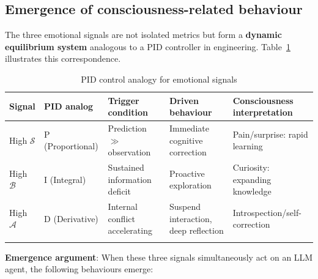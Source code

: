 \documentclass[pdflatex,sn-mathphys-num]{sn-jnl}
\newcommand{\surprise}{\mathcal{S}}
\newcommand{\boredom}{\mathcal{B}}
\newcommand{\anxiety}{\mathcal{A}}
\theoremstyle{thmstyleone}%
\theoremstyle{thmstyletwo}%
\theoremstyle{thmstylethree}%
\begin{document}
\subsection{Emergence of consciousness-related behaviour}\label{sec:emergence}

The three emotional signals are not isolated metrics but form a \textbf{dynamic equilibrium system} analogous to a PID controller in engineering. Table~\ref{tab:pid} illustrates this correspondence.

\begin{table}[h]
\caption{PID control analogy for emotional signals}\label{tab:pid}%
\small
\begin{tabular}{@{}p{1.5cm}p{2.2cm}p{2.8cm}p{2.8cm}p{3.2cm}@{}}
\toprule
Signal & PID analog & Trigger condition & Driven behaviour & Consciousness interpretation \\
\midrule
High $\surprise$ & P (Proportional) & Prediction $\gg$ observation & Immediate cognitive correction & Pain/surprise: rapid learning \\
High $\boredom$ & I (Integral) & Sustained information deficit & Proactive exploration & Curiosity: expanding knowledge \\
High $\anxiety$ & D (Derivative) & Internal conflict accelerating & Suspend interaction, deep reflection & Introspection/self-correction \\
\botrule
\end{tabular}
\end{table}

\textbf{Emergence argument}: When these three signals simultaneously act on an LLM agent, the following behaviours emerge:
\end{document}
